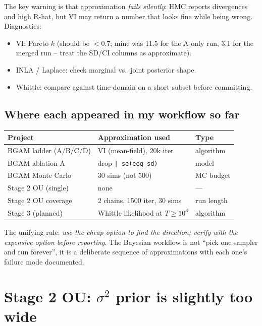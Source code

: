 \documentclass[11pt,a4paper]{article}
\begin{document}
\noindent The key warning is that approximation \emph{fails
silently}: HMC reports divergences and high R-hat, but VI may
return a number that looks fine while being wrong. Diagnostics:

\begin{itemize}\setlength{\itemsep}{0pt}
    \item VI: Pareto $k$ (should be $< 0.7$; mine was 11.5 for the
          A-only run, 3.1 for the merged run -- treat the SD/CI
          columns as approximate).
    \item INLA / Laplace: check marginal vs.\ joint posterior shape.
    \item Whittle: compare against time-domain on a short subset
          before committing.
\end{itemize}

\subsection*{Where each appeared in my workflow so far}

\begin{center}
\begin{tabular}{lll}
\toprule
Project & Approximation used & Type \\
\midrule
BGAM ladder (A/B/C/D) & VI (mean-field), 20k iter        & algorithm \\
BGAM ablation A       & drop \texttt{| se(eeg\_sd)}      & model \\
BGAM Monte Carlo      & 30 sims (not 500)                & MC budget \\
Stage 2 OU (single)   & none                              & --- \\
Stage 2 OU coverage   & 2 chains, 1500 iter, 30 sims      & run length \\
Stage 3 (planned)     & Whittle likelihood at $T\ge 10^3$ & algorithm \\
\bottomrule
\end{tabular}
\end{center}

\noindent The unifying rule: \emph{use the cheap option to find the
direction; verify with the expensive option before reporting}. The
Bayesian workflow is not ``pick one sampler and run forever'', it
is a deliberate sequence of approximations with each one's failure
mode documented.

\section*{Stage 2 OU: $\sigma^2$ prior is slightly too wide}
\end{document}
